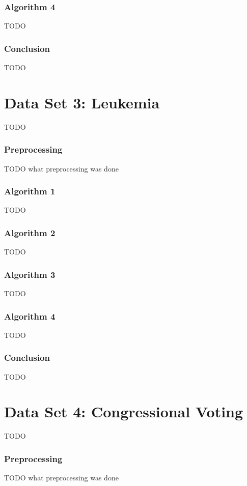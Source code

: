 \documentclass{sig-alternate-05-2015}
\begin{document}
\subsubsection{Algorithm 4}
TODO\\
\subsubsection{Conclusion}
TODO\\


\section{Data Set 3: Leukemia}
TODO\\
\subsubsection{Preprocessing}
TODO what preprocessing was done\\
\subsubsection{Algorithm 1}
TODO\\
\subsubsection{Algorithm 2}
TODO\\
\subsubsection{Algorithm 3}
TODO\\
\subsubsection{Algorithm 4}
TODO\\
\subsubsection{Conclusion}
TODO\\


\section{Data Set 4: Congressional Voting}
TODO\\
\subsubsection{Preprocessing}
TODO what preprocessing was done\\
\end{document}
